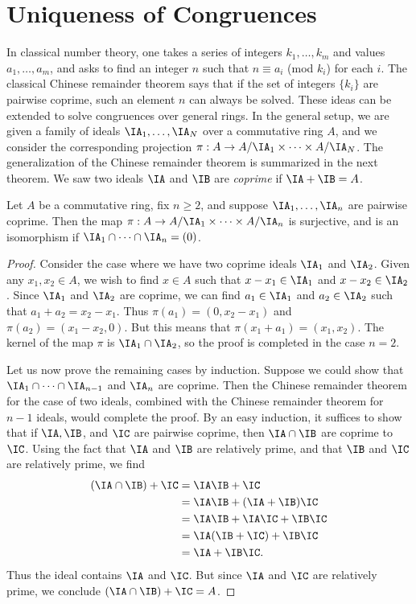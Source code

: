 \section{Uniqueness of Congruences}

In classical number theory, one takes a series of integers $k_1, \dots, k_m$ and values $a_1, \dots, a_m$, and asks to find an integer $n$ such that $n \equiv a_i$ (mod $k_i$) for each $i$. The classical Chinese remainder theorem says that if the set of integers $\{ k_i \}$ are pairwise coprime, such an element $n$ can always be solved. These ideas can be extended to solve congruences over general rings. In the general setup, we are given a family of ideals $\IA_1, \dots, \IA_N$ over a commutative ring $A$, and we consider the corresponding projection $\pi: A \to A/\IA_1 \times \dots \times A/\IA_N$. The generalization of the Chinese remainder theorem is summarized in the next theorem. We saw two ideals $\IA$ and $\IB$ are \emph{coprime} if $\IA + \IB = A$.

\begin{theorem}
    Let $A$ be a commutative ring, fix $n \geq 2$, and suppose $\IA_1, \dots, \IA_n$ are pairwise coprime. Then the map $\pi: A \to A/\IA_1 \times \dots \times A/\IA_n$ is surjective, and is an isomorphism if $\IA_1 \cap \dots \cap \IA_n = (0)$.
\end{theorem}
\begin{proof}
    Consider the case where we have two coprime ideals $\IA_1$ and $\IA_2$. Given any $x_1,x_2 \in A$, we wish to find $x \in A$ such that $x - x_1 \in \IA_1$ and $x - x_2 \in \IA_2$. Since $\IA_1$ and $\IA_2$ are coprime, we can find $a_1 \in \IA_1$ and $a_2 \in \IA_2$ such that $a_1 + a_2 = x_2 - x_1$. Thus $\pi(a_1) = (0,x_2-x_1)$ and $\pi(a_2) = (x_1-x_2,0)$. But this means that $\pi(x_1 + a_1) = (x_1,x_2)$. The kernel of the map $\pi$ is $\IA_1 \cap \IA_2$, so the proof is completed in the case $n = 2$.

    Let us now prove the remaining cases by induction. Suppose we could show that $\IA_1 \cap \dots \cap \IA_{n-1}$ and $\IA_n$ are coprime. Then the Chinese remainder theorem for the case of two ideals, combined with the Chinese remainder theorem for $n - 1$ ideals, would complete the proof. By an easy induction, it suffices to show that if $\IA, \IB$, and $\IC$ are pairwise coprime, then $\IA \cap \IB$ are coprime to $\IC$. Using the fact that $\IA$ and $\IB$ are relatively prime, and that $\IB$ and $\IC$ are relatively prime, we find
    \begin{align*}
        (\IA \cap \IB) + \IC &= \IA \IB + \IC\\
        &= \IA \IB + (\IA + \IB) \IC\\
        &= \IA \IB + \IA \IC + \IB \IC\\
        &= \IA (\IB + \IC) + \IB \IC\\
        &= \IA + \IB \IC.
    \end{align*}
    Thus the ideal contains $\IA$ and $\IC$. But since $\IA$ and $\IC$ are relatively prime, we conclude $(\IA \cap \IB) + \IC = A$.
\end{proof}

